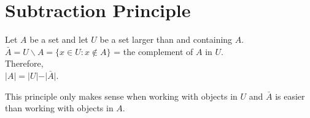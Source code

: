 \documentclass[12pt, letterpaper]{article}
\begin{document}
\pagebreak
\section*{Subtraction Principle}
\begin{center}
  Let \(A\) be a set and let \(U\) be a set larger than and containing \(A\).
  \(\bar{A} = U \backslash A = \{x \in U : x \notin A\}\) = the complement of \(A\) in \(U\). \\
  Therefore,\\
   \(\vert A \vert = \vert U \vert - \vert \bar{A} \vert\).
\end{center}
This principle only makes sense when working with objects in \(U\) and \(\bar{A}\) is easier than working with objects in \(A\). 
\end{document}
